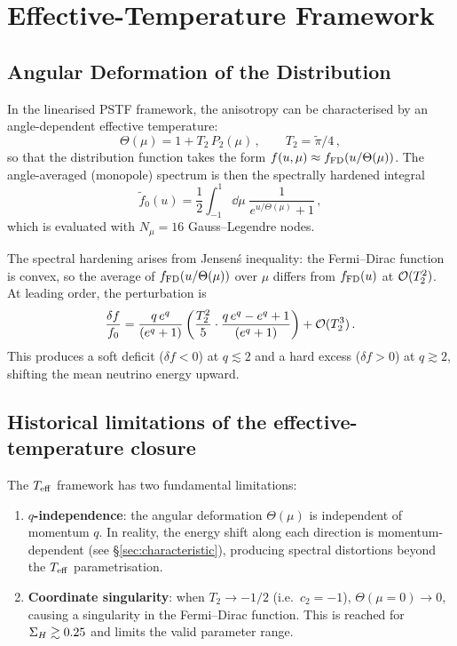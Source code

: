 \section{Effective-Temperature Framework}\label{sec:teff}

\subsection{Angular Deformation of the Distribution}

In the linearised PSTF framework, the anisotropy can be characterised by an angle-dependent effective temperature:
\begin{equation}
\Theta(\mu) = 1 + T_2\,P_2(\mu)\,,\qquad T_2 = \tilde\pi/4\,,\label{eq:theta_def}
\end{equation}
so that the distribution function takes the form $f(u, \mu) \approx f_{\rm FD}(u/\Theta(\mu))$.  The angle-averaged (monopole) spectrum is then the spectrally hardened integral
\begin{equation}
\tilde{f}_0(u) = \frac{1}{2}\int_{-1}^{1}\dd\mu\;\frac{1}{e^{u/\Theta(\mu)} + 1}\,,\label{eq:teff_mono}
\end{equation}
which is evaluated with $N_\mu = 16$ Gauss--Legendre nodes.

The spectral hardening arises from Jensen\'s inequality: the Fermi--Dirac function is convex, so the average of $f_{\rm FD}(u/\Theta(\mu))$ over $\mu$ differs from $f_{\rm FD}(u)$ at $\mathcal{O}(T_2^2)$.  At leading order, the perturbation is
\begin{equation}
\frac{\delta f}{f_0} = \frac{q\,e^q}{(e^q + 1)}\left(\frac{T_2^2}{5}\cdot\frac{q\,e^q - e^q + 1}{(e^q + 1)}\right) + \mathcal{O}(T_2^3)\,.
\end{equation}
This produces a soft deficit ($\delta f < 0$) at $q \lesssim 2$ and a hard excess ($\delta f > 0$) at $q \gtrsim 2$, shifting the mean neutrino energy upward.

\subsection{Historical limitations of the effective-temperature closure}

The $T_{\rm eff}$ framework has two fundamental limitations:

\begin{enumerate}
\item \textbf{$q$-independence}: the angular deformation $\Theta(\mu)$ is independent of momentum $q$.  In reality, the energy shift along each direction is momentum-dependent (see \S\ref{sec:characteristic}), producing spectral distortions beyond the $T_{\rm eff}$ parametrisation.

\item \textbf{Coordinate singularity}: when $T_2 \to -1/2$ (i.e.\ $c_2 = -1$), $\Theta(\mu = 0) \to 0$, causing a singularity in the Fermi--Dirac function.  This is reached for $\Sigma_H \gtrsim 0.25$ and limits the valid parameter range.
\end{enumerate}

